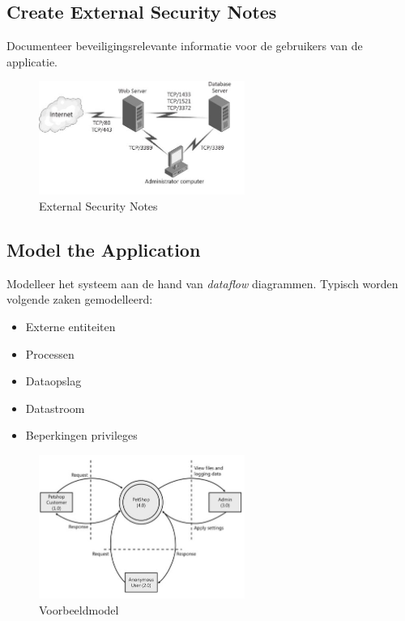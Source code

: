 \documentclass[../main.tex]{subfiles}
\begin{document}
\subsection{Create External Security Notes}
Documenteer beveiligingsrelevante informatie voor de gebruikers van de applicatie.
\begin{figure}[h1]
    \centering
    \includegraphics[width=0.6\textwidth]{../images/external_security_notes.png}
    \caption{External Security Notes}
    \label{fig:external_security_notes}
\end{figure}

\subsection{Model the Application}
Modelleer het systeem aan de hand van \textit{dataflow} diagrammen. Typisch worden volgende zaken gemodelleerd:
\begin{multicols}{2}
\begin{itemize}
	\item Externe entiteiten
	\item Processen
	\item Dataopslag
	\item Datastroom
	\item Beperkingen privileges
\end{itemize}
\end{multicols}

\begin{figure}[h!]
    \centering
    \includegraphics[width=0.6\textwidth]{../images/pet_shop_model_1.png}
    \caption{Voorbeeldmodel}
    \label{example1}
\end{figure}
\end{document}
